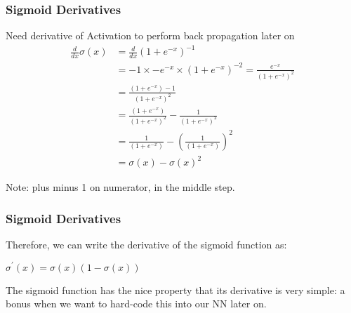 \begin{frame}[fragile] \frametitle{Sigmoid Derivatives}

Need derivative of Activation to perform back propagation later on
\begin{align*}
\frac{d}{dx}\sigma ( x ) &= \frac{d}{dx} \left( 1 + e^{ -x }\right)^{-1}\\
&=  -1 \times -e^{-x} \times \left(1 + e^{-x}\right)^{-2}= \frac{ e^{-x} }{ \left(1 + e^{-x}\right)^{2} } \\
&= \frac{\left(1 + e^{-x}\right) - 1}{\left(1 + e^{-x}\right)^{2}} \\
&= \frac{\left(1 + e^{-x}\right) }{\left(1 + e^{-x}\right)^{2}} - \frac{1}{\left(1 + e^{-x}\right)^{2}} \\
&= \frac{1}{\left(1 + e^{-x}\right)} - \left( \frac{1}{\left(1 + e^{-x}\right)} \right)^{2} \\[0.5em]
&= \sigma ( x ) - \sigma ( x ) ^ {2}
\end{align*}

Note:  plus minus 1 on numerator, in the middle step.

\end{frame}

\begin{frame}[fragile] \frametitle{Sigmoid Derivatives}

Therefore, we can write the derivative of the sigmoid function as:

$\sigma^{\prime}( x ) = \sigma (x ) \left( 1 - \sigma ( x ) \right)$

The sigmoid function has the nice property that its derivative is very simple: a bonus when we want to hard-code this into our NN later on.
\end{frame}




